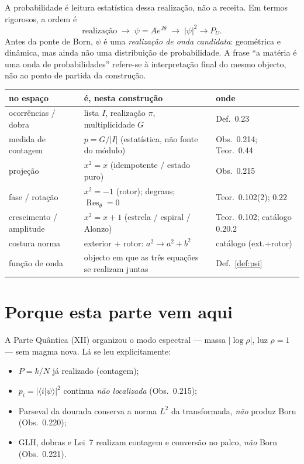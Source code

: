 \documentclass[11pt,a4paper]{article}
\begin{document}
A probabilidade é leitura estatística dessa realização, não a receita.
Em termos rigorosos, a ordem é
\[
\text{realização} \;\to\; \psi=Ae^{J\theta} \;\to\; |\psi|^2\to P_U.
\]
Antes da ponte de Born, $\psi$ é uma \emph{realização de onda candidata}: geométrica e dinâmica,
mas ainda não uma distribuição de probabilidade. A frase “a matéria é uma onda de probabilidades”
refere-se à interpretação final do mesmo objecto, não ao ponto de partida da construção.

\vspace{1em}
\begin{center}
\renewcommand{\arraystretch}{1.25}
\begin{tabular}{@{}p{3.4cm}p{7.6cm}p{3.6cm}@{}}
\toprule
\textbf{no espaço} & \textbf{é, nesta construção} & \textbf{onde} \\
\midrule
ocorrências / dobra &
lista $I$, realização $\pi$, multiplicidade $G$ &
Def.~0.23 \\
medida de contagem &
$p=G/|I|$ (estatística, não fonte do módulo) &
Obs.~0.214; Teor.~0.44 \\
projeção &
$x^2=x$ (idempotente / estado puro) &
Obs.~0.215 \\
fase / rotação &
$x^2=-1$ (rotor); degraus; $\operatorname{Res}_\theta=0$ &
Teor.~0.102(2); 0.22 \\
crescimento / amplitude &
$x^2=x+1$ (estrela / espiral / Alonzo) &
Teor.~0.102; catálogo 0.20.2 \\
costura norma &
exterior + rotor: $a^2\to a^2+b^2$ &
catálogo (ext.+rotor) \\
função de onda &
objecto em que as três equações se realizam juntas &
Def.~\ref{def:psi} \\
\bottomrule
\end{tabular}
\end{center}

\section{Porque esta parte vem aqui}

A Parte Quântica (XII) organizou o modo espectral --- massa $|\log\rho|$, luz $\rho=1$ ---
sem magma nova. Lá se leu explicitamente:

\begin{itemize}[leftmargin=1.4em,itemsep=2pt]
  \item $P=k/N$ já realizado (contagem);
  \item $p_i=|\langle i|\psi\rangle|^2$ continua \emph{não localizada} (Obs.~0.215);
  \item Parseval da dourada conserva a norma $L^2$ da transformada, \emph{não} produz Born
        (Obs.~0.220);
  \item GLH, dobras e Lei~7 realizam contagem e conversão no palco, \emph{não} Born
        (Obs.~0.221).
\end{itemize}
\end{document}
